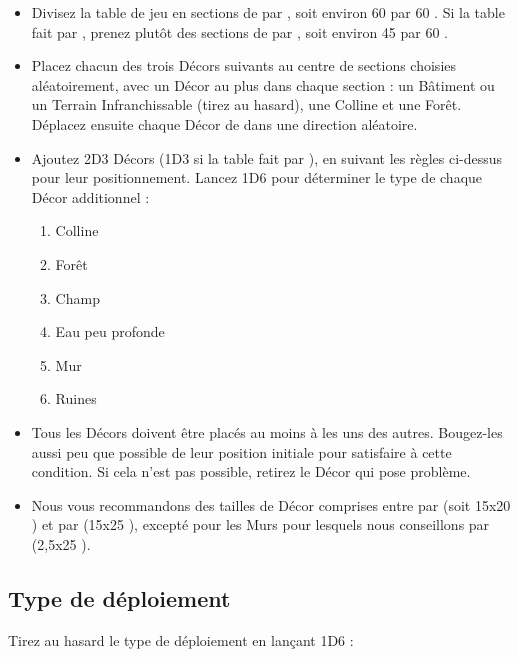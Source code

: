 \begin{itemize}[label={\textbullet}]
\item Divisez la table de jeu en sections de  par , soit environ 60 {\centi\meter} par 60 {\centi\meter}. Si la table fait  par , prenez plutôt des sections de  par , soit environ 45 {\centi\meter} par 60 {\centi\meter}.

\item Placez chacun des trois Décors suivants au centre de sections choisies aléatoirement, avec un Décor au plus dans chaque section : un Bâtiment ou un Terrain Infranchissable (tirez au hasard), une Colline et une Forêt. Déplacez ensuite chaque Décor de  dans une direction aléatoire.

\item Ajoutez 2D3 Décors (1D3 si la table fait  par ), en suivant les règles ci-dessus pour leur positionnement. Lancez 1D6 pour déterminer le type de chaque Décor additionnel :
\begin{enumerate}
\item Colline
\item Forêt
\item Champ
\item Eau peu profonde
\item Mur
\item Ruines
\end{enumerate}

\item Tous les Décors doivent être placés au moins à  les uns des autres. Bougez-les aussi peu que possible de leur position initiale pour satisfaire à cette condition. Si cela n'est pas possible, retirez le Décor qui pose problème.

\item Nous vous recommandons des tailles de Décor comprises entre  par  (soit 15x20 {\centi\meter}) et  par  (15x25 {\centi\meter}), excepté pour les Murs pour lesquels nous conseillons  par  (2,5x25 {\centi\meter}).
\end{itemize}


\newpage
\hypertarget{deploymenttype}{\subsection{Type de déploiement}}

\hypertarget{deploymenttypefigure}{%
Tirez au hasard le type de déploiement en lançant 1D6 :
}

